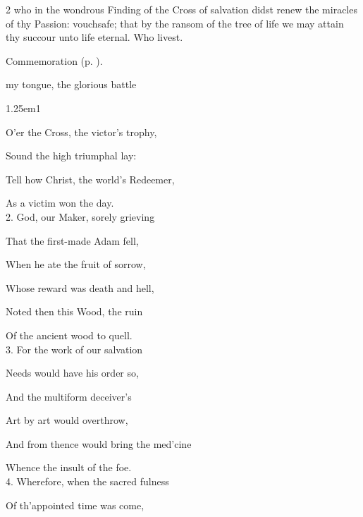 \begin{paracol}{2}
\collect
{} who in the wondrous Finding of the Cross of salvation didst renew the miracles of thy Passion: vouchsafe; that by the ransom of the tree of life we may attain thy succour unto life eternal. Who livest.
\begin{rubric}
	 Commemoration  (p. \pageref{AlexanderEtcCollect}).
\end{rubric}


\switchcolumn

\vspace{-2\baselineskip}

\mattins
{}

\mattinsInvitatoryHymn
{} my tongue, the glorious battle


\begin{hangparas}{1.25em}{1}

O'er the Cross, the victor's trophy,

Sound the high triumphal lay:

Tell how Christ, the world's Redeemer,

As a victim won the day.\\

2. God, our Maker, sorely grieving

That the first-made Adam fell,

When he ate the fruit of sorrow,

Whose reward was death and hell,

Noted then this Wood, the ruin

Of the ancient wood to quell.\\

3. For the work of our salvation

Needs would have his order so,

And the multiform deceiver's

Art by art would overthrow,

And from thence would bring the med'cine

Whence the insult of the foe.\\

4. Wherefore, when the sacred fulness

Of th'appointed time was come,


\end{hangparas}
\end{paracol}
